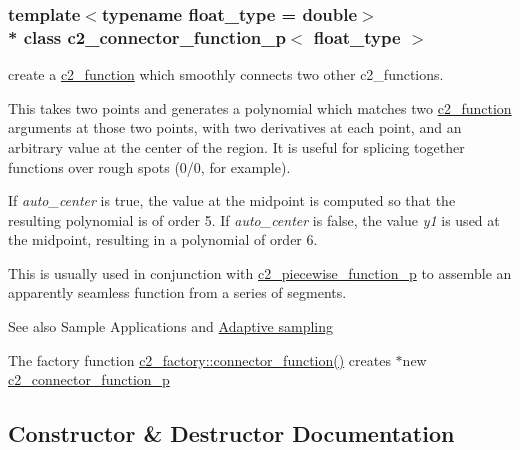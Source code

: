 \subsubsection*{template$<$typename float\+\_\+type = double$>$\\*
class c2\+\_\+connector\+\_\+function\+\_\+p$<$ float\+\_\+type $>$}

create a \hyperlink{classc2__function}{c2\+\_\+function} which smoothly connects two other c2\+\_\+functions.

This takes two points and generates a polynomial which matches two \hyperlink{classc2__function}{c2\+\_\+function} arguments at those two points, with two derivatives at each point, and an arbitrary value at the center of the region. It is useful for splicing together functions over rough spots (0/0, for example). 

If {\itshape auto\+\_\+center} is true, the value at the midpoint is computed so that the resulting polynomial is of order 5. If {\itshape auto\+\_\+center} is false, the value {\itshape y1} is used at the midpoint, resulting in a polynomial of order 6.

This is usually used in conjunction with \hyperlink{classc2__piecewise__function__p}{c2\+\_\+piecewise\+\_\+function\+\_\+p} to assemble an apparently seamless function from a series of segments. \begin{DoxySeeAlso}{See also}
Sample Applications and \hyperlink{classc2__function_aea75f73d6a97087571c163ae4e514652}{Adaptive sampling}
\end{DoxySeeAlso}
The factory function \hyperlink{classc2__factory_ac8c9d70e5c486a0025e288e5911f2a55}{c2\+\_\+factory\+::connector\+\_\+function()} creates $\ast$new \hyperlink{classc2__connector__function__p}{c2\+\_\+connector\+\_\+function\+\_\+p} 

\subsection{Constructor \& Destructor Documentation}
